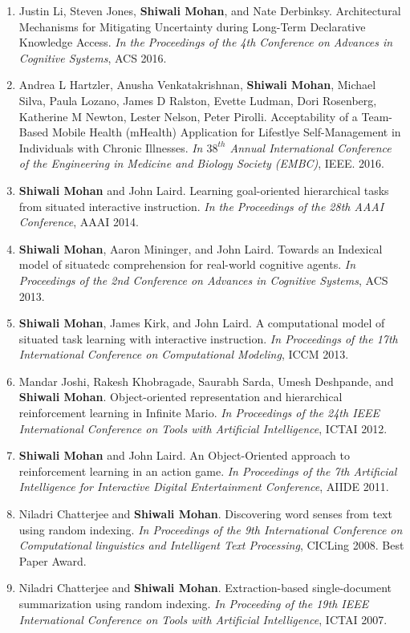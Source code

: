 \documentclass[margin,line,11pt]{res}
\begin{document}
\begin{resume}
\begin{enumerate}[label=\lbrack C\arabic*\rbrack,leftmargin=*]
                    \item Justin Li, Steven Jones, \textbf{Shiwali Mohan}, and Nate Derbinksy. Architectural Mechanisms for Mitigating Uncertainty during Long-Term Declarative Knowledge Access. \emph{In the Proceedings of the 4th Conference on Advances in Cognitive Systems}, ACS 2016.
                   \item Andrea L Hartzler, Anusha Venkatakrishnan, \textbf{Shiwali Mohan}, Michael Silva, Paula Lozano, James D Ralston, Evette Ludman, Dori Rosenberg, Katherine M Newton, Lester Nelson, Peter Pirolli. Acceptability of a Team-Based Mobile Health (mHealth) Application for Lifestlye Self-Management in Individuals with Chronic Illnesses. \emph{In $38^{th}$ Annual International Conference of the Engineering in Medicine and Biology Society (EMBC)}, IEEE. 2016.
                    
                  \item \textbf{Shiwali Mohan} and John Laird. Learning goal-oriented hierarchical tasks from situated interactive instruction. \emph{In the Proceedings of the 28th AAAI Conference}, AAAI 2014.
                  \item \textbf{Shiwali Mohan}, Aaron Mininger, and John Laird. Towards an Indexical model of situatedc comprehension for real-world cognitive agents. \emph{In Proceedings of the 2nd Conference on Advances in Cognitive Systems}, ACS 2013.
                  \item \textbf{Shiwali Mohan}, James Kirk, and John Laird. A computational model of situated task learning with interactive instruction. \emph{In Proceedings of the 17th International Conference on Computational Modeling}, ICCM 2013.
                  \item Mandar Joshi, Rakesh Khobragade, Saurabh Sarda, Umesh Deshpande, and \textbf{Shiwali Mohan}. Object-oriented
                    representation and hierarchical reinforcement learning in Infinite Mario. \emph{In Proceedings of the 24th IEEE
                      International Conference on Tools with Artificial Intelligence}, ICTAI 2012.
                  \item \textbf{Shiwali Mohan} and John Laird. An Object-Oriented approach to reinforcement learning in an action game.
                    \emph{In Proceedings of the 7th Artificial Intelligence for Interactive Digital Entertainment Conference}, AIIDE 2011.
                  \item Niladri Chatterjee and \textbf{Shiwali Mohan}. Discovering word senses from text using random indexing. \emph{In
                    Proceedings of the 9th International Conference on Computational linguistics and Intelligent Text Processing},
                    CICLing 2008. Best Paper Award.
                  \item Niladri Chatterjee and \textbf{Shiwali Mohan}. Extraction-based single-document summarization using random
                    indexing. \emph{In Proceeding of the 19th IEEE International Conference on Tools with Artificial Intelligence}, ICTAI
                    2007.
                  \end{enumerate}


\end{resume}
\end{document}
